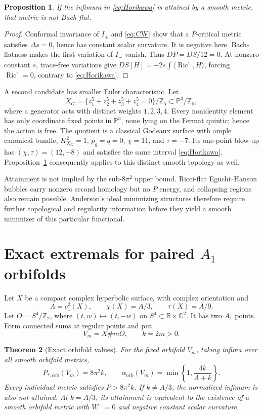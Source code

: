 \documentclass[11pt,a4paper]{article}
\newtheorem{theorem}{Theorem}[section]
\newtheorem{proposition}[theorem]{Proposition}
\theoremstyle{definition}\newtheorem{definition}[theorem]{Definition}
\theoremstyle{remark}\newtheorem{remark}[theorem]{Remark}
\newcommand{\Ric}{\operatorname{Ric}}
\newcommand{\R}{\mathbb R}
\newcommand{\Z}{\mathbb Z}
\newcommand{\orb}{\mathrm{orb}}
\newcommand{\ip}[2]{\langle #1,#2\rangle}
\begin{document}
\begin{proposition}\label{prop:nonBach}
If the infimum in \eqref{eq:Horikawa} is attained by a smooth metric, that metric is not Bach-flat.
\end{proposition}
\begin{proof}
Conformal invariance of $I_+$ and \eqref{eq:CW} show that a $P$-critical metric satisfies $\Delta s=0$, hence has constant scalar curvature. It is negative here. Bach-flatness makes the first variation of $I_+$ vanish. Thus $DP=DS/12=0$. At nonzero constant $s$, trace-free variations give
$DS[H]=-2s\int\ip{\Ric^\circ}{H}$, forcing $\Ric^\circ=0$, contrary to \eqref{eq:Horikawa}.
\end{proof}
A second candidate has smaller Euler characteristic. Let
\[
 X_G=\{z_1^5+z_2^5+z_3^5+z_4^5=0\}/\Z_5\subset\mathbb P^3/\Z_5,
\]
where a generator acts with distinct weights $1,2,3,4$. Every nonidentity element has only coordinate fixed points in $\mathbb P^3$, none lying on the Fermat quintic; hence the action is free. The quotient is a classical Godeaux surface with ample canonical bundle, $K_{X_G}^2=1$, $p_g=q=0$, $\chi=11$, and $\tau=-7$. Its one-point blow-up has $(\chi,\tau)=(12,-8)$ and satisfies the same interval \eqref{eq:Horikawa}. Proposition~\ref{prop:nonBach} consequently applies to this distinct smooth topology as well.

Attainment is not implied by the sub-$8\pi^2$ upper bound. Ricci-flat Eguchi--Hanson bubbles carry nonzero second homology but no $P$ energy, and collapsing regions also remain possible. Anderson's ideal minimizing structures \cite{Anderson} therefore require further topological and regularity information before they yield a smooth minimizer of this particular functional.

\section{Exact extremals for paired \texorpdfstring{$A_1$}{A1} orbifolds}
Let $X$ be a compact complex hyperbolic surface, with complex orientation and
\[
 A=c_1^2(X),\qquad\chi(X)=A/3,\qquad\tau(X)=A/9.
\]
Let $O=S^4/\Z_2$, where $(t,w)\mapsto(t,-w)$ on $S^4\subset\R\times\mathbb C^2$. It has two $A_1$ points. Form connected sums at regular points and put
\[
 V_m=X\#mO,\qquad k=2m>0.
\]

\begin{theorem}[Exact orbifold values]\label{thm:orbifold}
For the fixed orbifold $V_m$, taking infima over all smooth orbifold metrics,
\begin{equation}\label{eq:orbexact}
 P_{*,\orb}(V_m)=8\pi^2k,\qquad
 \alpha_\orb(V_m)=\min\left\{1,\frac{4k}{A+k}\right\}.
\end{equation}
Every individual metric satisfies $P>8\pi^2k$. If $k\ne A/3$, the normalized infimum is also not attained. At $k=A/3$, its attainment is equivalent to the existence of a smooth orbifold metric with $W^-=0$ and negative constant scalar curvature.
\end{theorem}
\end{document}
